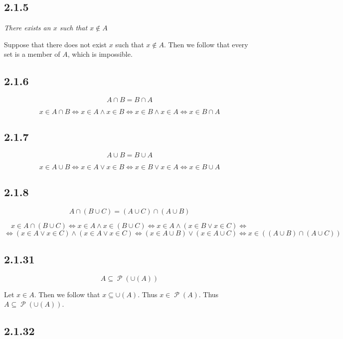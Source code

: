 \documentclass[11pt,oneside,titlepage]{book}
\DeclareMathOperator \pow {\mathcal {P}}
\DeclareMathOperator \lra {\Leftrightarrow}
\begin{document}
\subsection*{2.1.5}

\textit{There exists an $x$ such that $x \notin A$}

Suppose that there does not exist $x$ such that $x \notin A$. Then we follow that every set is a
member of $A$, which is impossible.

\subsection*{2.1.6}

$$A \cap B = B \cap A$$

$$x \in A \cap B \iff x \in A \land x \in B \iff x \in B \land x \in A \iff x \in B \cap A$$

\subsection*{2.1.7}

$$A \cup B = B \cup A$$

$$x \in A \cup B \iff x \in A \lor x \in B \iff x \in B \lor x \in A \iff x \in B \cup A$$

\subsection*{2.1.8}

$$A \cap (B \cup C) = (A \cup C) \cap (A \cup B)$$

$$x \in A \cap (B \cup C) \lra  x \in A \land x \in (B \cup C) \lra
x \in A \land (x \in B \lor x \in C) \lra
$$
$$ \lra (x \in A \lor x \in C) \land (x \in A \lor x \in C)
\lra (x \in A \cup B) \lor (x \in A \cup C) \lra x \in ((A \cup B) \cap (A \cup C))$$

\subsection*{2.1.31}

$$A \subseteq \pow(\cup(A))$$

Let $x \in A$. Then we follow that $x \subseteq \cup(A)$. Thus $x \in \pow(A)$. Thus
$A \subseteq \pow(\cup(A))$.

\subsection*{2.1.32}
\end{document}
